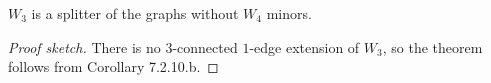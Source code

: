 \begin{theorem}[7.2.11.b]
  \label{thm:7.2.11.b}
  $W_{3}$ is a splitter of the graphs without $W_{4}$ minors.
\end{theorem}

\begin{proof}[Proof sketch]
  There is no $3$-connected $1$-edge extension of $W_{3}$, so the theorem follows from Corollary 7.2.10.b.
\end{proof}

\begin{theorem}[7.3.3]
  \label{thm:7.3.3}
\end{theorem}

\begin{theorem}[7.3.4]
  \label{thm:7.3.4}
\end{theorem}

\begin{theorem}[7.4.1]
  \label{thm:7.4.1}
\end{theorem}
